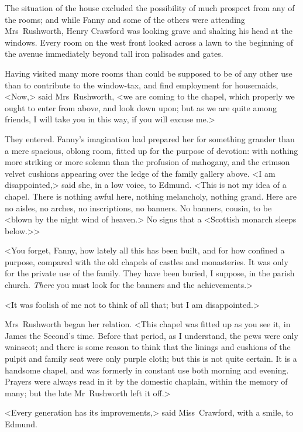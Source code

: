 The situation of the house excluded the possibility of much prospect from any of the rooms; and while Fanny and some of the others were attending Mrs~Rushworth, Henry Crawford was looking grave and shaking his head at the windows. Every room on the west front looked across a lawn to the beginning of the avenue immediately beyond tall iron palisades and gates.

Having visited many more rooms than could be supposed to be of any other use than to contribute to the window-tax, and find employment for housemaids, <Now,> said Mrs~Rushworth, <we are coming to the chapel, which properly we ought to enter from above, and look down upon; but as we are quite among friends, I will take you in this way, if you will excuse me.>

They entered. Fanny's imagination had prepared her for something grander than a mere spacious, oblong room, fitted up for the purpose of devotion: with nothing more striking or more solemn than the profusion of mahogany, and the crimson velvet cushions appearing over the ledge of the family gallery above. <I am disappointed,> said she, in a low voice, to Edmund. <This is not my idea of a chapel. There is nothing awful here, nothing melancholy, nothing grand. Here are no aisles, no arches, no inscriptions, no banners. No banners, cousin, to be <blown by the night wind of heaven.> No signs that a <Scottish monarch sleeps below.>>

<You forget, Fanny, how lately all this has been built, and for how confined a purpose, compared with the old chapels of castles and monasteries. It was only for the private use of the family. They have been buried, I suppose, in the parish church. \textit{There}  you must look for the banners and the achievements.>

<It was foolish of me not to think of all that; but I am disappointed.>

Mrs~Rushworth began her relation. <This chapel was fitted up as you see it, in James the Second's time. Before that period, as I understand, the pews were only wainscot; and there is some reason to think that the linings and cushions of the pulpit and family seat were only purple cloth; but this is not quite certain. It is a handsome chapel, and was formerly in constant use both morning and evening. Prayers were always read in it by the domestic chaplain, within the memory of many; but the late Mr~Rushworth left it off.>

<Every generation has its improvements,> said Miss~Crawford, with a smile, to Edmund.

